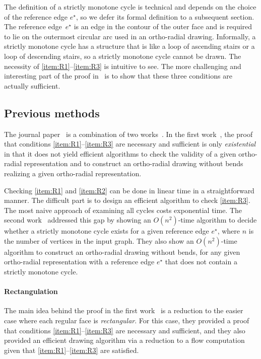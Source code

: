 \documentclass{article}\usepackage[a4paper,margin=20mm]{geometry}
\newcommand{\eref}{e^\star}
\begin{document}
The definition of a strictly monotone cycle is  technical and depends on the choice of the reference edge $\eref$, so we defer its formal definition to a subsequent section. 
The reference edge~$\eref$ is an edge in the contour of the outer face and is required to lie on the outermost circular arc used in an ortho-radial drawing. 
Informally, a strictly monotone cycle has a structure that is like a loop of ascending stairs or a loop of descending stairs, so a strictly monotone cycle cannot be drawn. The necessity of \ref{item:R1}--\ref{item:R3} is intuitive to see. The more challenging and interesting part of the proof in~\cite{barth2023topology} is to show that these three conditions are actually sufficient.


\subsection{Previous methods}
The journal paper~\cite{barth2023topology} is a combination of two works~\cite{barth2017,niedermann19}.
In the first work~\cite{barth2017}, the proof that conditions \ref{item:R1}--\ref{item:R3} are necessary and sufficient is only \emph{existential} in that it does not yield efficient algorithms to check the {validity} of a given ortho-radial representation and to construct an ortho-radial drawing without bends realizing a given ortho-radial representation.

Checking \ref{item:R1} and \ref{item:R2} can be done in linear time in a straightforward manner. The difficult part is to design an efficient algorithm to check \ref{item:R3}. The most naive approach of examining all cycles costs exponential time. 
The second work~\cite{niedermann19} addressed this gap by showing an $O(n^2)$-time algorithm to decide whether a strictly monotone cycle exists for a given reference edge $\eref$, where $n$ is the number of vertices in the input graph. They also show an $O(n^2)$-time algorithm to construct an ortho-radial drawing without bends, for any given ortho-radial representation with a reference edge $\eref$ that does not contain a strictly monotone cycle.

\paragraph{Rectangulation}
The main idea behind the proof in the first work~\cite{barth2017} is a reduction to the easier case where each regular face is \emph{rectangular}. For this case, they provided a proof that conditions \ref{item:R1}--\ref{item:R3} are necessary and sufficient, and they also provided an efficient drawing algorithm via a reduction to a flow computation given that \ref{item:R1}--\ref{item:R3} are satisfied. 
\end{document}
